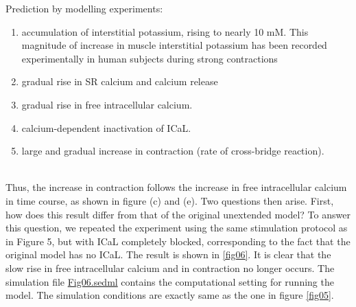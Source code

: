 \documentclass[fleqn,10pt]{physiome}
\begin{document}
Prediction by modelling experiments:
\renewcommand{\labelenumi}{(\alph{enumi})}
\begin{enumerate}
     \item accumulation of interstitial potassium, rising to nearly 10 mM. This magnitude of increase in muscle interstitial potassium has been recorded experimentally in human subjects during strong contractions \citep{green2000interstitial} 
     \item gradual rise in SR calcium and calcium release
     \item gradual rise in free intracellular calcium.
     \item calcium-dependent inactivation of ICaL.
     \item large and gradual increase in contraction (rate of cross-bridge reaction).
\end{enumerate}\\ 
Thus, the increase in contraction follows the increase in free intracellular calcium in time course, as shown in figure (c) and (e). Two questions then arise. First, how does this result differ from that of the original unextended model? To answer this question, we repeated the experiment using the same stimulation protocol as in Figure 5, but with ICaL completely blocked, corresponding to the fact that the original \citep{shorten2007mathematical} model has no ICaL.  The result is shown in \autoref{fig06}. It is clear that the slow rise in free intracellular calcium and in contraction no longer occurs. The simulation file \href{http://models.cellml.org/workspace/5f4/file/4071d5b4ec40c5e2b845a7a75e942df1966d2ba2/Fig06.sedml}{Fig06.sedml} contains the computational setting for running the model. The simulation conditions are exactly same as the one in figure \ref{fig05}.
\end{document}
